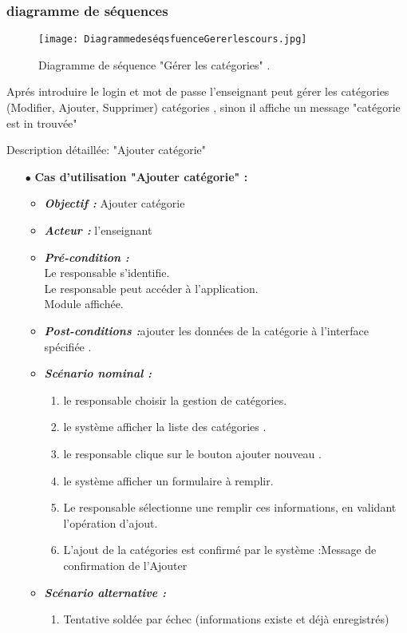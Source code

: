 \subsubsection{diagramme de séquences }
\begin{figure}[ht]
	\centering
	\texttt{[image: DiagrammedeséqsfuenceGererlescours.jpg]}
	\caption{Diagramme de séquence "Gérer les catégories" .}
	\label{fig:Diagramme de séquence "Gérer les catégories"  }
\end{figure}
\FloatBarrier
\clearpage
Aprés introduire le login et mot de passe l’enseignant peut gérer les catégories (Modifier, Ajouter,
Supprimer) catégories , sinon il affiche un message "catégorie est in trouvée"

{\Large \color{cyan} Description détaillée: "Ajouter catégorie"}
\begin{itemize}
	\item[$\bullet$] \textbf{Cas d’utilisation "Ajouter catégorie" :} 
	\medskip
	\begin{itemize}
		\item \textit{\textbf{Objectif :}} Ajouter catégorie	
		\item \textit{\textbf{Acteur :}}  l'enseignant
		\item \textit{\textbf{Pré-condition  :}} \\
		Le responsable s’identifie.\\
		Le responsable peut accéder à l’application.\\
		Module affichée.
		\item \textit{\textbf{Post-conditions   :}}ajouter les données de la catégorie à l'interface spécifiée .
		\item \textit{\textbf{Scénario nominal :}}
		\begin{enumerate}
			\item le responsable choisir la gestion de catégories.
			\item le système afficher la liste des catégories .
			\item le responsable clique sur le bouton ajouter nouveau .
			
			\item le système afficher un formulaire à remplir. 
			\item  Le responsable sélectionne une remplir ces
			informations, en validant l’opération d’ajout. 
			\item L’ajout de la catégories est confirmé par le système :Message de confirmation de l'Ajouter  
			
		\end{enumerate}
		\item \textit{\textbf{Scénario alternative :}}
		\begin{enumerate}
			\item Tentative soldée par échec (informations existe et
			déjà enregistrés)
		\end{enumerate}
	\end{itemize}
\end{itemize}	
\bigskip


